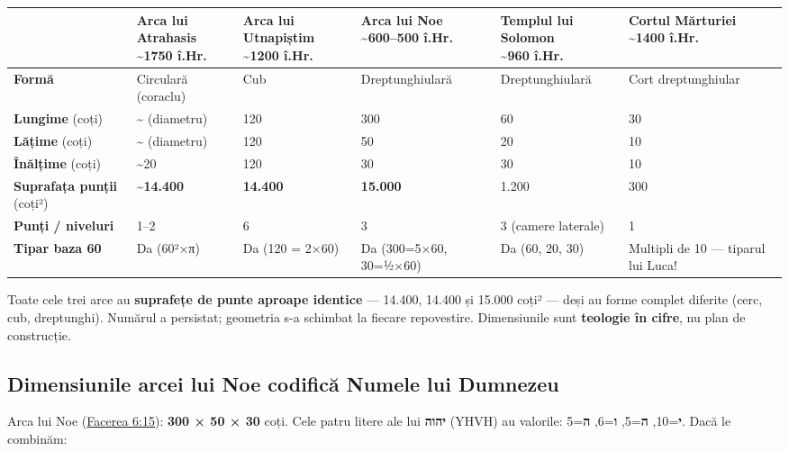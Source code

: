 \documentclass[12pt,a4paper,twoside,openany]{book}
\begin{document}
\footnotesize
\begin{longtable}{L{1.9cm}L{2.4cm}L{2.5cm}L{2.2cm}L{2.4cm}L{2.8cm}}
\toprule
{}
 & \textbf{Arca lui Atrahasis \newline  \textasciitilde{}1750 î.Hr.} & \textbf{Arca lui Utnapiștim \newline  \textasciitilde{}1200 î.Hr.} & \textbf{Arca lui Noe \newline  \textasciitilde{}600–500 î.Hr.} & \textbf{Templul lui Solomon \newline  \textasciitilde{}960 î.Hr.} & \textbf{Cortul Mărturiei \newline  \textasciitilde{}1400 î.Hr.} \\
\midrule
\endhead
\textbf{Formă} & Circulară (coraclu) & Cub & Dreptunghiulară & Dreptunghiulară & Cort dreptunghiular \\
\textbf{Lungime} (coți) & \textasciitilde{} (diametru) & 120 & 300 & 60 & 30 \\
\textbf{Lățime} (coți) & \textasciitilde{} (diametru) & 120 & 50 & 20 & 10 \\
\textbf{Înălțime} (coți) & \textasciitilde{}20 & 120 & 30 & 30 & 10 \\
\textbf{Suprafața punții} (coți²) & \textbf{\textasciitilde{}14.400} & \textbf{14.400} & \textbf{15.000} & 1.200 & 300 \\
\textbf{Punți / niveluri} & 1–2 & 6 & 3 & 3 (camere laterale) & 1 \\
\textbf{Tipar baza 60} & Da (60²×π) & Da (120 = 2×60) & Da (300=5×60, 30=½×60) & Da (60, 20, 30) & Multipli de 10 — tiparul lui Luca! \\
\bottomrule
\end{longtable}
\normalsize
Toate cele trei arce au \textbf{suprafețe de punte aproape identice} — 14.400, 14.400 și 15.000 coți² — deși au forme complet diferite (cerc, cub, dreptunghi). Numărul a persistat; geometria s-a schimbat la fiecare repovestire. Dimensiunile sunt \textbf{teologie în cifre}, nu plan de construcție.


\subsection{Dimensiunile arcei lui Noe codifică Numele lui Dumnezeu}
Arca lui Noe (\href{https://bibliaortodoxa.ro/carte.php?id=25\&cap=6\#15}{Facerea 6:15}): \textbf{300 × 50 × 30} coți. Cele patru litere ale lui \textbf{יהוה} (YHVH) au valorile: \textbf{י}=10, \textbf{ה}=5, \textbf{ו}=6, \textbf{ה}=5. Dacă le combinăm:
\end{document}
